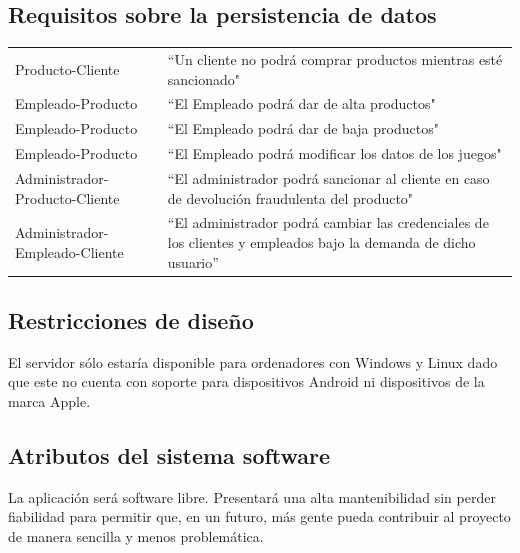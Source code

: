 \subsection{Requisitos sobre la persistencia de datos}
\noindent\begin{tabularx}{\textwidth}{ l X }
    Producto-Cliente               & ``Un cliente no podrá comprar productos mientras esté sancionado"                                                \\
    Empleado-Producto              & ``El Empleado podrá dar de alta productos"                                                                       \\
    Empleado-Producto              & ``El Empleado podrá dar de baja productos"                                                                       \\
    Empleado-Producto              & ``El Empleado podrá modificar los datos de los juegos"                                                           \\
    Administrador-Producto-Cliente & ``El administrador podrá sancionar al cliente en caso de devolución fraudulenta del producto"                    \\
    Administrador-Empleado-Cliente & ``El administrador podrá cambiar las credenciales de los clientes y empleados bajo la demanda de dicho usuario'' \\
\end{tabularx}
\subsection{Restricciones de diseño}
El servidor sólo estaría disponible para ordenadores con Windows y Linux dado que este no cuenta con soporte para dispositivos Android ni dispositivos de la marca Apple.
\subsection{Atributos del sistema software}
La aplicación será software libre. Presentará una alta mantenibilidad sin perder fiabilidad para permitir que, en un futuro, más gente pueda contribuir al proyecto de manera sencilla y menos problemática.
